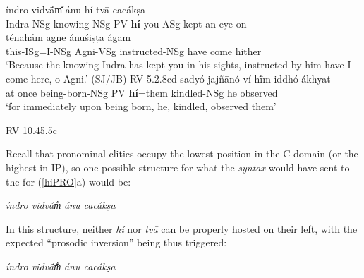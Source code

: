 \documentclass[output=paper,
modfonts
]{LSP/langsci}
\begin{document}
\begin{exe}
\ex\label{hiPRO}
	\begin{xlist}
	\ex\gll índro vidvā́m̐ ánu hí tvā cacákṣa \\
			Indra-NSg knowing-NSg PV \textbf{hí} you-ASg {kept an eye on} \\
				
		\gll ténāhám agne ánuśiṣṭa ā́gām \\
			 this-ISg=I-NSg Agni-VSg instructed-NSg {have come hither} \\
		\glt `Because the knowing Indra has kept you in his sights, instructed by him have I come here, o Agni.' (SJ/JB) \hfill {RV 5.2.8cd}
	\ex\gll sadyó jajñānó ví hī́m iddhó ákhyat \\
			{at once} being-born-NSg PV \textbf{hí}=them kindled-NSg {he observed} \\
		\glt `for immediately upon being born, he, kindled, observed them'
		
		\hfill {RV 10.45.5c}
	\end{xlist}
\end{exe}

\noindent Recall that pronominal clitics occupy the lowest position in the C-domain (or the highest in IP), so one possible structure for what the \textit{syntax} would
have sent to the  for (\ref{hiPRO}a) would be:


\begin{exe}
\ex\label{outsidein}
{\ob} \textit{índro vidvā́m̐}{\cb} {\ob} {\textit{}} {\ob}{} {\ob}\textit{ánu cacákṣa}{\cb}{\cb}{\cb}
\end{exe}

\noindent In this structure, neither \textit{hí} nor \textit{tvā} can be properly hosted on their left, with the expected
``prosodic inversion'' being thus triggered:

\vspace*{2ex}
\begin{exe}\ex
{\ob} \textit{índro vidvā́m̐}{\cb} {\ob} {\textcolor{gray}{\textit{}}} {\ob}{\textcolor{gray}{}} {\ob}\textit{ánu   cacákṣa}{\cb}{\cb}{\cb}  
\end{exe}
\vspace*{1ex}
\end{document}
